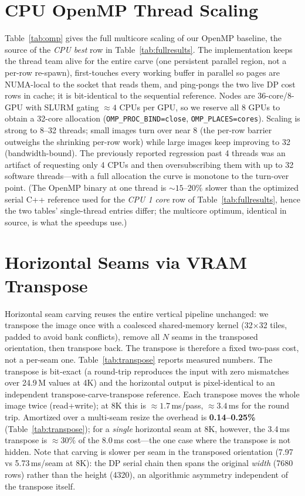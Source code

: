 \documentclass[conference]{IEEEtran}
\begin{document}
\section{CPU OpenMP Thread Scaling}
\label{app:omp}
Table~\ref{tab:omp} gives the full multicore scaling of our OpenMP baseline,
the source of the \emph{CPU best} row in Table~\ref{tab:fullresults}.
The implementation keeps the thread team alive for the entire carve (one
persistent parallel region, not a per-row re-spawn), first-touches every working
buffer in parallel so pages are NUMA-local to the socket that reads them, and
ping-pongs the two live DP cost rows in cache; it is bit-identical to the
sequential reference. Nodes are 36-core/8-GPU with SLURM gating ${\approx}4$
CPUs per GPU, so we reserve all 8 GPUs to obtain a 32-core allocation
(\texttt{OMP\_PROC\_BIND=close}, \texttt{OMP\_PLACES=cores}).
Scaling is strong to 8--32 threads; small images turn over near 8 (the per-row
barrier outweighs the shrinking per-row work) while large images keep improving
to 32 (bandwidth-bound). The previously reported regression past 4 threads was
an artifact of requesting only 4 CPUs and then oversubscribing them with up to
32 software threads---with a full allocation the curve is monotone to the
turn-over point.
(The OpenMP binary at one thread is ${\sim}15$--$20\%$ slower than the optimized
serial C++ reference used for the \emph{CPU 1 core} row of
Table~\ref{tab:fullresults}, hence the two tables' single-thread entries differ;
the multicore optimum, identical in source, is what the speedups use.)



\section{Horizontal Seams via VRAM Transpose}
\label{app:transpose}
Horizontal seam carving reuses the entire vertical pipeline unchanged: we
transpose the image once with a coalesced shared-memory kernel
(32$\times$32 tiles, padded to avoid bank conflicts), remove all $N$ seams in
the transposed orientation, then transpose back. The transpose is therefore a
fixed two-pass cost, not a per-seam one.
Table~\ref{tab:transpose} reports measured numbers. The transpose is bit-exact
(a round-trip reproduces the input with zero mismatches over 24.9\,M values at
4K) and the horizontal output is pixel-identical to an independent
transpose-carve-transpose reference.
Each transpose moves the whole image twice (read+write); at 8K this is
${\approx}1.7$\,ms/pass, ${\approx}3.4$\,ms for the round trip.
Amortized over a multi-seam resize the overhead is \textbf{0.14--0.25\%}
(Table~\ref{tab:transpose}); for a \emph{single} horizontal seam at 8K, however,
the 3.4\,ms transpose is ${\approx}30\%$ of the 8.0\,ms cost---the one case
where the transpose is not hidden.
Note that carving is slower per seam in the transposed orientation
(7.97 vs 5.73\,ms/seam at 8K): the DP serial chain then spans the original
\emph{width} (7680 rows) rather than the height (4320), an algorithmic
asymmetry independent of the transpose itself.
\end{document}
